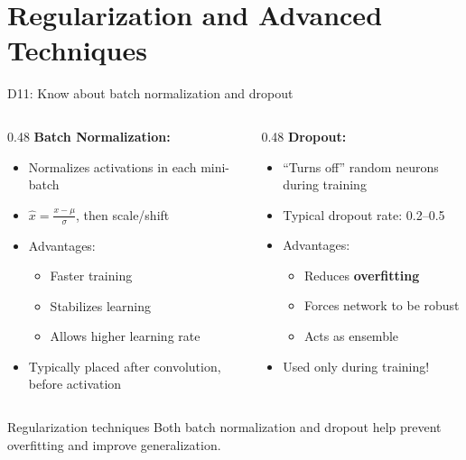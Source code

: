 \documentclass[aspectratio=169, 10pt]{beamer}
\begin{document}
\section{Regularization and Advanced Techniques}

\begin{frame}{D11: Know about batch normalization and dropout}
    \begin{columns}[T]
        \begin{column}{0.48\textwidth}
            \textbf{Batch Normalization:}
            \begin{itemize}
                \item Normalizes activations in each mini-batch
                \item $\hat{x} = \frac{x - \mu}{\sigma}$, then scale/shift
                \item Advantages:
                \begin{itemize}
                    \item Faster training
                    \item Stabilizes learning
                    \item Allows higher learning rate
                \end{itemize}
                \item Typically placed after convolution, before activation
            \end{itemize}
        \end{column}
        \begin{column}{0.48\textwidth}
            \textbf{Dropout:}
            \begin{itemize}
                \item ``Turns off'' random neurons during training
                \item Typical dropout rate: 0.2--0.5
                \item Advantages:
                \begin{itemize}
                    \item Reduces \textbf{overfitting}
                    \item Forces network to be robust
                    \item Acts as ensemble
                \end{itemize}
                \item Used only during training!
            \end{itemize}
        \end{column}
    \end{columns}
    
    \vspace{0.5cm}
    \begin{block}{Regularization techniques}
        Both batch normalization and dropout help prevent overfitting and improve generalization.
    \end{block}
\end{frame}
\end{document}
